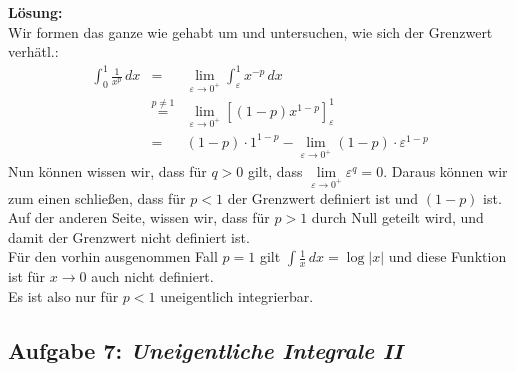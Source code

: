 \documentclass[11pt,a4paper,ngerman]{article}
\begin{document}
\begin{enumerate}[(i)]
		\textbf{Lösung:}\\
		Wir formen das ganze wie gehabt um und untersuchen, wie sich der Grenzwert verhätl.:
		$$\begin{array}{rcl}
			\int_0^1 \frac{1}{x^p} \, dx &=& \underset{\varepsilon \rightarrow 0^+}{\lim} \int_\varepsilon^1 x^{-p} \, dx\\
				&\stackrel{p\not=1}{=}& \underset{\varepsilon \rightarrow 0^+}{\lim} \left[ (1-p)x^{1-p}\right]_\varepsilon^1\\
				&=& (1-p)\cdot 1^{1-p} - \underset{\varepsilon \rightarrow 0^+}{\lim} (1-p) \cdot \varepsilon^{1-p}
		\end{array}$$
		Nun können wissen wir, dass für $q>0$ gilt, dass $\underset{\varepsilon \rightarrow 0^+}{\lim} \varepsilon^q = 0$.
		Daraus können wir zum einen schließen, dass für $p<1$ der Grenzwert definiert ist und $(1-p)$ ist.\\
		Auf der anderen Seite, wissen wir, dass für $p>1$ durch Null geteilt wird, und damit der Grenzwert nicht definiert ist.\\
		Für den vorhin ausgenommen Fall $p=1$ gilt $\int \frac{1}{x} \, dx = \log |x|$ und diese Funktion ist für $x \rightarrow 0$ auch nicht
		definiert.\\
		Es ist also nur für $p<1$ uneigentlich integrierbar.
\end{enumerate}


\subsection*{Aufgabe 7: \mdseries\itshape Uneigentliche Integrale II}
\end{document}

